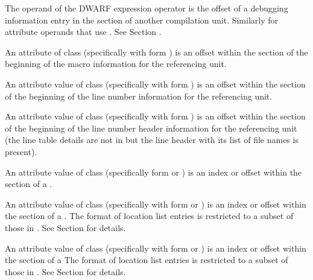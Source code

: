 \begin{description}
The operand of the \DWOPcallref{} DWARF expression 
operator is the offset of a debugging 
information entry in the \dotdebuginfodwo{} section of 
another compilation unit.  Similarly for attribute 
operands that use \DWFORMrefaddr. 
See Section .

An attribute of class \CLASSmacptr{} (specifically \DWATmacros{} 
with form \DWFORMsecoffset{}) is an offset within the 
\dotdebugmacrodwo{} section of the beginning of the macro 
information for the referencing unit.

An attribute value of class \CLASSlineptr{} (specifically 
\DWATstmtlist{} with form \DWFORMsecoffset) 
is an offset within the \dotdebugline{} section of the 
beginning of the line number information for the 
referencing unit.

An attribute value of class \CLASSlineptr{} (specifically  
\DWATstmtlist{}  with form \DWFORMsecoffset) 
is an offset within the \dotdebuglinedwo{} section of the 
beginning of the line number header information 
for the referencing unit (the line table details are not in 
\dotdebuglinedwo{} but the line header with its list 
of file names is present).


\bb
{}
An attribute value of class \CLASSrnglist{} 
(specifically form \DWFORMrnglistx{} or \DWFORMsecoffset) 
is an index or offset within the \dotdebugrnglists{} 
section of a .
\eb

An attribute value of class \CLASSrnglist{} (specifically 
\DWATranges{} with form \DWFORMrnglistx{} or \DWFORMsecoffset) 
is an index or offset within the \dotdebugrnglistsdwo{}
section of a .
The format of \dotdebugrnglistsdwo{} location list entries 
is restricted to a subset of those in \dotdebugrnglists.
See Section  for details.

An attribute value of class 
\CLASSloclist{} (specifically with form \DWFORMloclistx{}
or \DWFORMsecoffset) 
is an index or offset within the \dotdebugloclistsdwo{} 
section of a 
The format of \dotdebugloclistsdwo{} location list entries 
is restricted to a subset of those in \dotdebugloclists.
See Section  for details.


\end{description}
